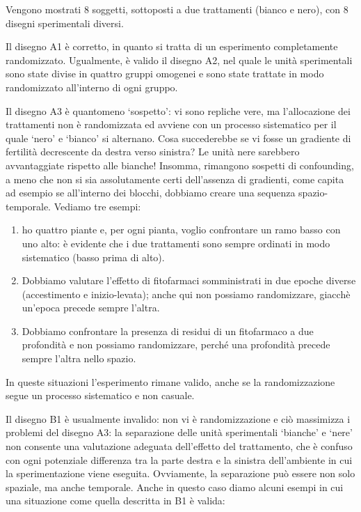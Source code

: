 \documentclass[a4paper,12pt,oneside]{book}
\providecommand{\tightlist}{%
  \setlength{\itemsep}{0pt}\setlength{\parskip}{0pt}}
\begin{document}
Vengono mostrati 8 soggetti, sottoposti a due trattamenti (bianco e
nero), con 8 disegni sperimentali diversi.

Il disegno A1 è corretto, in quanto si tratta di un esperimento
completamente randomizzato. Ugualmente, è valido il disegno A2, nel
quale le unità sperimentali sono state divise in quattro gruppi omogenei
e sono state trattate in modo randomizzato all'interno di ogni gruppo.

Il disegno A3 è quantomeno `sospetto': vi sono repliche vere, ma
l'allocazione dei trattamenti non è randomizzata ed avviene con un
processo sistematico per il quale `nero' e `bianco' si alternano. Cosa
succederebbe se vi fosse un gradiente di fertilità decrescente da destra
verso sinistra? Le unità nere sarebbero avvantaggiate rispetto alle
bianche! Insomma, rimangono sospetti di confounding, a meno che non si
sia assolutamente certi dell'assenza di gradienti, come capita ad
esempio se all'interno dei blocchi, dobbiamo creare una sequenza
spazio-temporale. Vediamo tre esempi:

\begin{enumerate}
\def\labelenumi{\arabic{enumi}.}
\tightlist
\item
  ho quattro piante e, per ogni pianta, voglio confrontare un ramo basso
  con uno alto: è evidente che i due trattamenti sono sempre ordinati in
  modo sistematico (basso prima di alto).
\item
  Dobbiamo valutare l'effetto di fitofarmaci somministrati in due epoche
  diverse (accestimento e inizio-levata); anche qui non possiamo
  randomizzare, giacchè un'epoca precede sempre l'altra.
\item
  Dobbiamo confrontare la presenza di residui di un fitofarmaco a due
  profondità e non possiamo randomizzare, perché una profondità precede
  sempre l'altra nello spazio.
\end{enumerate}

In queste situazioni l'esperimento rimane valido, anche se la
randomizzazione segue un processo sistematico e non casuale.

Il disegno B1 è usualmente invalido: non vi è randomizzazione e ciò
massimizza i problemi del disegno A3: la separazione delle unità
sperimentali `bianche' e `nere' non consente una valutazione adeguata
dell'effetto del trattamento, che è confuso con ogni potenziale
differenza tra la parte destra e la sinistra dell'ambiente in cui la
sperimentazione viene eseguita. Ovviamente, la separazione può essere
non solo spaziale, ma anche temporale. Anche in questo caso diamo alcuni
esempi in cui una situazione come quella descritta in B1 è valida:
\end{document}
